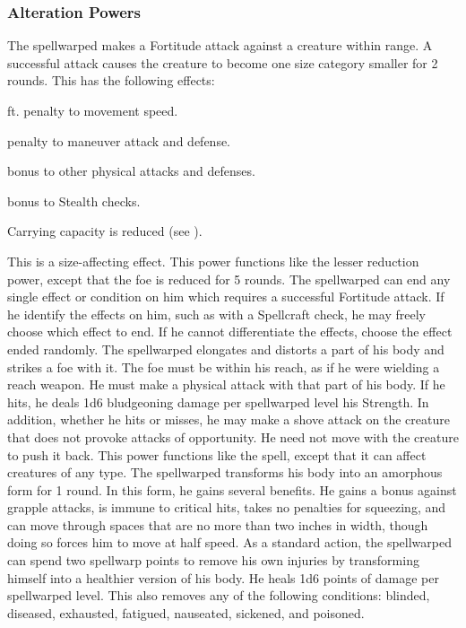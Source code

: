 \subsubsection{Alteration Powers}
 The spellwarped makes a Fortitude attack against a creature within \rngclose range. A successful attack causes the creature to become one size category smaller for 2 rounds. This has the following effects:
  \begin{itemize*} 
    \item {} ft. penalty to movement speed.
    \item {} penalty to maneuver attack and defense.
    \item {} bonus to other physical attacks and defenses.
    \item {} bonus to Stealth checks.
    \item Carrying capacity is reduced (see ).
  \end{itemize*}
This is a size-affecting effect.
 This power functions like the lesser reduction power, except that the foe is reduced for 5 rounds.
 The spellwarped can end any single effect or condition on him which requires a successful Fortitude attack. If he identify the effects on him, such as with a Spellcraft check, he may freely choose which effect to end. If he cannot differentiate the effects, choose the effect ended randomly.
 The spellwarped elongates and distorts a part of his body and strikes a foe with it. The foe must be within his reach, as if he were wielding a reach weapon. He must make a physical attack with that part of his body. If he hits, he deals 1d6 bludgeoning damage per spellwarped level \add his Strength. In addition, whether he hits or misses, he may make a shove attack on the creature that does not provoke attacks of opportunity. He need not move with the creature to push it back.
 This power functions like the  spell, except that it can affect creatures of any type.
 The spellwarped transforms his body into an amorphous form for 1 round. In this form, he gains several benefits. He gains a  bonus against grapple attacks, is immune to critical hits, takes no penalties for squeezing, and can move through spaces that are no more than two inches in width, though doing so forces him to move at half speed.
 As a standard action, the spellwarped can spend two spellwarp points to remove his own injuries by transforming himself into a healthier version of his body. He heals 1d6 points of damage per spellwarped level. This also removes any of the following conditions: blinded, diseased, exhausted, fatigued, nauseated, sickened, and poisoned.
